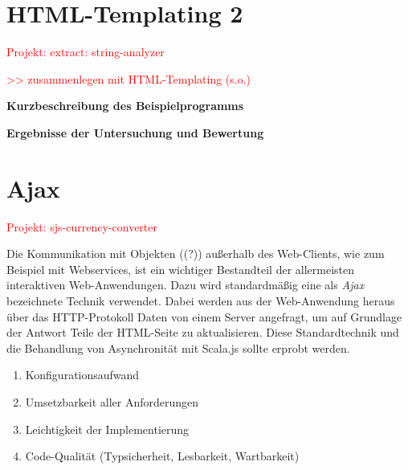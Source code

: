 \documentclass[a4paper, 12pt, hidelinks, listof=totoc, listoftables=totoc, bibliography=totoc]{scrreprt}
\newcommand{\TODO}[1]{\textcolor{red}{#1}\newline}
\newcommand{\MyMiniSec}[1]{\rmfamily\fontsize{12}{15}\selectfont
	\vspace{7pt}\textbf{#1} %
}
\begin{document}
\section{HTML-Templating 2}


\TODO{Projekt: extract: string-analyzer}

\TODO{>> zusammenlegen mit HTML-Templating (s.o.)}

\MyMiniSec{Kurzbeschreibung des Beispielprogramms}
\MyMiniSec{Ergebnisse der Untersuchung und Bewertung}


\section{Ajax}


\TODO{Projekt: sjs-currency-converter}


Die Kommunikation mit Objekten ((?)) außerhalb des Web-Clients, wie zum Beispiel mit Webservices, ist ein wichtiger Bestandteil der allermeisten interaktiven Web-Anwendungen. Dazu wird standardmäßig eine als \emph{Ajax} bezeichnete Technik verwendet. Dabei werden aus der Web-Anwendung heraus über das HTTP-Protokoll Daten von einem Server angefragt, um auf Grundlage der Antwort Teile der HTML-Seite zu aktualisieren. Diese Standardtechnik und die Behandlung von Asynchronität mit Scala.js sollte erprobt werden.


\begin{enumerate}
	\item Konfigurationsaufwand
	\item Umsetzbarkeit aller Anforderungen
	\item Leichtigkeit der Implementierung
	\item Code-Qualität (Typsicherheit, Lesbarkeit, Wartbarkeit)
\end{enumerate}
\end{document}
